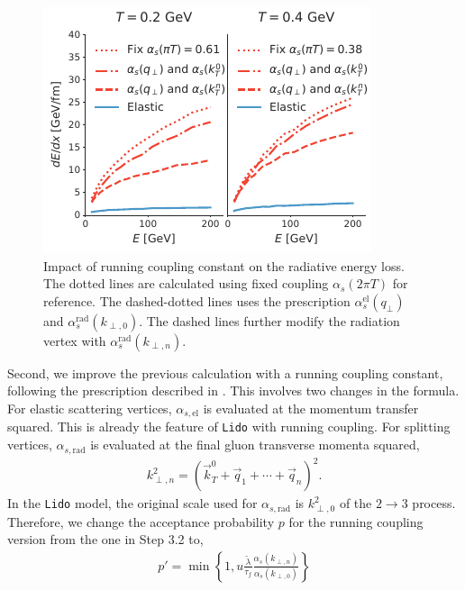 \documentclass[aps, prc, reprint, amsmath, groupedaddress, nofootinbib]{revtex4-1}
\begin{document}
\begin{figure}
\includegraphics[width=\columnwidth]{Eloss_infinite_run.pdf}
\caption{Impact of running coupling constant on the radiative energy loss. The dotted lines are calculated using fixed coupling $\alpha_s(2\pi T)$ for reference. The dashed-dotted lines uses the prescription $\alpha_s^{\textrm{el}}(q_\perp)$ and $\alpha_s^{\textrm{rad}}(k_{\perp,0})$. The dashed lines further modify the radiation vertex with $\alpha_s^{\textrm{rad}}(k_{\perp,n})$.}
\label{fig:run}
\end{figure}
Second, we improve the previous calculation with a running coupling constant, following the prescription described in \cite{Arnold:2008zu}.
This involves two changes in the formula. 
For elastic scattering vertices, $\alpha_{s, \textrm{el}}$ is evaluated at the momentum transfer squared. 
This is already the feature of {\tt Lido} with running coupling.
For splitting vertices,  $\alpha_{s, \textrm{rad}}$ is evaluated at the final gluon transverse momenta squared,
\begin{eqnarray}\label{eq:kTn}
k_{\perp,n}^2 = \left(\vec{k}_T^0+\vec{q}_1+\cdots+\vec{q}_n\right)^2.
\end{eqnarray} 
In the {\tt Lido} model, the original scale used for $\alpha_{s, \textrm{rad}}$ is $k_{\perp,0}^2$ of the $2\rightarrow 3$ process.
Therefore, we change the acceptance probability $p$ for the running coupling version from the one in Step 3.2 to,
\begin{eqnarray}
p' = \min\left\{1, u\frac{\tilde{\lambda}}{\tau_f}\frac{\alpha_s(k_{\perp,n})}{\alpha_s(k_{\perp,0})}\right\}
\end{eqnarray}
\end{document}
